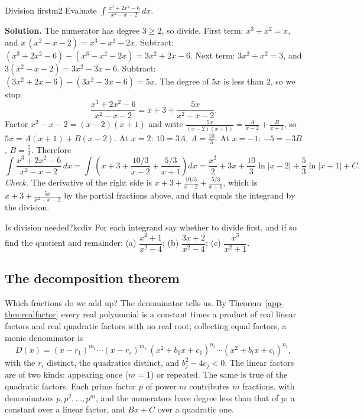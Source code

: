 \documentclass[11pt]{article}
\begin{document}
\begin{exmp}{Division first}{m2}
Evaluate $\displaystyle\int\frac{x^3+2x^2-6}{x^2-x-2}\,dx$.

\textbf{Solution.} The numerator has degree $3\ge2$, so divide. First term: $x^3\div x^2=x$, and $x\,(x^2-x-2)=x^3-x^2-2x$. Subtract: $(x^3+2x^2-6)-(x^3-x^2-2x)=3x^2+2x-6$. Next term: $3x^2\div x^2=3$, and $3(x^2-x-2)=3x^2-3x-6$. Subtract: $(3x^2+2x-6)-(3x^2-3x-6)=5x$. The degree of $5x$ is less than $2$, so we stop:
\[\frac{x^3+2x^2-6}{x^2-x-2}=x+3+\frac{5x}{x^2-x-2}.\]
Factor $x^2-x-2=(x-2)(x+1)$ and write $\frac{5x}{(x-2)(x+1)}=\frac A{x-2}+\frac B{x+1}$, so $5x=A(x+1)+B(x-2)$. At $x=2$: $10=3A$, $A=\frac{10}3$. At $x=-1$: $-5=-3B$, $B=\frac53$. Therefore
\[\int\frac{x^3+2x^2-6}{x^2-x-2}\,dx=\int\left(x+3+\frac{10/3}{x-2}+\frac{5/3}{x+1}\right)dx=\frac{x^2}2+3x+\frac{10}3\ln\lvert x-2\rvert+\frac53\ln\lvert x+1\rvert+C .\]
\emph{Check.} The derivative of the right side is $x+3+\frac{10/3}{x-2}+\frac{5/3}{x+1}$, which is $x+3+\frac{5x}{x^2-x-2}$ by the partial fractions above, and that equals the integrand by the division.
\end{exmp}

\begin{kc}{Is division needed?}{kcdiv}
For each integrand say whether to divide first, and if so find the quotient and remainder: (a) $\dfrac{x^2+1}{x^2-4}$; (b) $\dfrac{3x+2}{x^2-4}$; (c) $\dfrac{x^3}{x^2+1}$.
\end{kc}

\subsection*{The decomposition theorem}

Which fractions do we add up? The denominator tells us. By Theorem~\ref{app-thm:realfactor} every real polynomial is a constant times a product of real linear factors and real quadratic factors with no real root; collecting equal factors, a monic denominator is
\[D(x)=(x-r_1)^{m_1}\cdots(x-r_s)^{m_s}\,\left(x^2+b_1x+c_1\right)^{n_1}\cdots\left(x^2+b_tx+c_t\right)^{n_t},\]
with the $r_i$ distinct, the quadratics distinct, and $b_j^2-4c_j<0$. The linear factors are of two kinds: appearing once ($m=1$) or repeated. The same is true of the quadratic factors. Each prime factor $p$ of power $m$ contributes $m$ fractions, with denominators $p,p^2,\dots,p^m$, and the numerators have degree less than that of $p$: a constant over a linear factor, and $Bx+C$ over a quadratic one.
\end{document}
